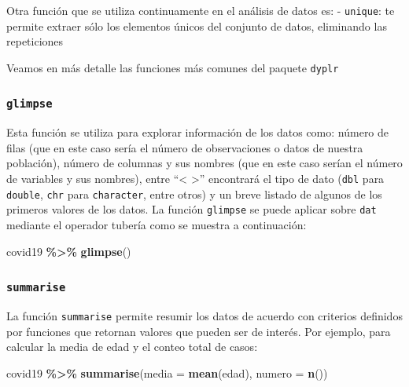 \documentclass[
]{article}
\newenvironment{Shaded}{\begin{snugshade}}{\end{snugshade}}
\newcommand{\AttributeTok}[1]{\textcolor[rgb]{0.13,0.29,0.53}{#1}}
\newcommand{\FunctionTok}[1]{\textcolor[rgb]{0.13,0.29,0.53}{\textbf{#1}}}
\newcommand{\NormalTok}[1]{#1}
\newcommand{\SpecialCharTok}[1]{\textcolor[rgb]{0.81,0.36,0.00}{\textbf{#1}}}
\begin{document}
Otra función que se utiliza continuamente en el análisis de datos es: -
\texttt{unique}: te permite extraer sólo los elementos únicos del
conjunto de datos, eliminando las repeticiones

Veamos en más detalle las funciones más comunes del paquete
\texttt{dyplr}

\subsubsection{\texorpdfstring{\texttt{glimpse}}{glimpse}}\label{glimpse}

Esta función se utiliza para explorar información de los datos como:
número de filas (que en este caso sería el número de observaciones o
datos de nuestra población), número de columnas y sus nombres (que en
este caso serían el número de variables y sus nombres), entre
``\textless{} \textgreater{}'' encontrará el tipo de dato (\texttt{dbl}
para \texttt{double}, \texttt{chr} para \texttt{character}, entre otros)
y un breve listado de algunos de los primeros valores de los datos. La
función \texttt{glimpse} se puede aplicar sobre \texttt{dat} mediante el
operador tubería como se muestra a continuación:

\begin{Shaded}
\begin{Highlighting}[]
\NormalTok{covid19 }\SpecialCharTok{\%\textgreater{}\%} \FunctionTok{glimpse}\NormalTok{()}
\end{Highlighting}
\end{Shaded}

\subsubsection{\texorpdfstring{\texttt{summarise}}{summarise}}\label{summarise}

La función \texttt{summarise} permite resumir los datos de acuerdo con
criterios definidos por funciones que retornan valores que pueden ser de
interés. Por ejemplo, para calcular la media de edad y el conteo total
de casos:

\begin{Shaded}
\begin{Highlighting}[]
\NormalTok{covid19 }\SpecialCharTok{\%\textgreater{}\%} \FunctionTok{summarise}\NormalTok{(}\AttributeTok{media =} \FunctionTok{mean}\NormalTok{(edad), }\AttributeTok{numero =} \FunctionTok{n}\NormalTok{())}
\end{Highlighting}
\end{Shaded}
\end{document}
